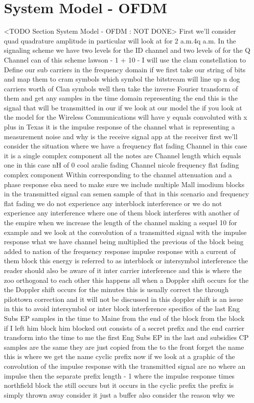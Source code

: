 \section{System Model - OFDM}
	<TODO Section System Model - OFDM : NOT DONE>
First we'll consider quad quadrature amplitude in particular will look at for 2 a.m.4q a.m. In the signaling scheme we have two levels for the ID channel and two levels of for the Q Channel can of this scheme lawson - 1 + 10 - I will use the clam constellation to Define our sub carriers in the frequency domain if we first take our string of bits and map them to cram symbols which symbol the bitstream will line up n dog carriers worth of Clan symbols well then take the inverse Fourier transform of them and get any samples in the time domain representing the end this is the signal that will be transmitted in our if we look at our model the if you look at the model for the Wireless Communications will have y equals convoluted with x plus in Texas it is the impulse response of the channel what is representing a measurement noise and why is the receive signal app at the receiver first we'll consider the situation where we have a frequency flat fading Channel in this case it is a single complex component all the notes are Channel length which equals one in this case nH of 0 cool aralie fading Channel nicole frequency flat fading complex component Within corresponding to the channel attenuation and a phase response elsa need to make sure we include multiple Mall imodium blocks in the transmitted signal can semen sample of that in this scenario and frequency flat fading we do not experience any interblock interference or we do not experience any interference where one of them block interferes with another of the empire when we increase the length of the channel making a sequel 10 for example and we look at the convolution of a transmitted signal with the impulse response what we have channel being multiplied the previous of the block being added to nation of the frequency response impulse response with a current of them block this energy is referred to as interblock or intersymbol interference the reader should also be aware of it inter carrier interference and this is where the zoo orthogonal to each other this happens all when a Doppler shift occurs for the the Doppler shift occurs for the minutes this is usually correct the through pilottown correction and it will not be discussed in this doppler shift is an issue in this to avoid intersymbol or inter block interference specifics of the last Eng Subs EP samples in the time to Maine from the end of the block from the block if I left him block him blocked out consists of a secret prefix and the end carrier transform into the time to me the first Eng Subs EP in the last and subsidies CP samples are the same they are just copied from the to the front forget the name this is where we get the name cyclic prefix now if we look at a graphic of the convolution of the impulse response with the transmitted signal are no where an impulse then the separate prefix length - 1 where the impulse response times northfield block the still occurs but it occurs in the cyclic prefix the prefix is simply thrown away consider it just a buffer also consider the reason why we 